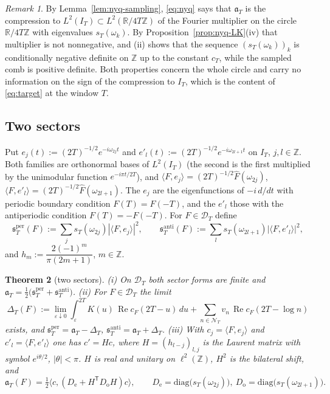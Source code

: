 \documentclass[11pt]{amsart}
\newtheorem{theorem}{Theorem}[section]
\theoremstyle{definition}
\theoremstyle{remark}
\newtheorem{remark}[theorem]{Remark}
\newcommand{\R}{\mathbb R}
\newcommand{\Z}{\mathbb Z}
\newcommand{\Rel}{\operatorname{Re}}
\newcommand{\IT}{I_T}
\newcommand{\Fh}{\widehat F}
\newcommand{\cF}{c_F}
\newcommand{\NT}{\mathcal N_T}
\begin{document}
\begin{remark}\label{rem:nyq-circle}
By Lemma~\ref{lem:nyq-sampling}, \eqref{eq:nyq} says that $\mathfrak a_T$ is the compression to
$L^2(\IT)\subset L^2(\R/4T\Z)$ of the Fourier multiplier on the circle $\R/4T\Z$ with eigenvalues
$s_T(\omega_k)$. By Proposition~\ref{prop:nyq-LK}(iv) that multiplier is not nonnegative, and (ii) shows that the
sequence $(s_T(\omega_k))_k$ is conditionally negative definite on $\Z$ up to the constant $c_T$, while the sampled
comb is positive definite. Both properties concern the whole circle and carry no information on the sign of the
compression to $\IT$, which is the content of \eqref{eq:target} at the window $T$.
\end{remark}

\subsection{Two sectors}
Put $e_j(t):=(2T)^{-1/2}e^{-i\omega_{2j}t}$ and $e'_l(t):=(2T)^{-1/2}e^{-i\omega_{2l+1}t}$ on $\IT$, $j,l\in\Z$. Both
families are orthonormal bases of $L^2(\IT)$ (the second is the first multiplied by the unimodular function
$e^{-i\pi t/2T}$), and $\langle F,e_j\rangle=(2T)^{-1/2}\Fh(\omega_{2j})$, $\langle F,e'_l\rangle=(2T)^{-1/2}\Fh(\omega_{2l+1})$.
The $e_j$ are the eigenfunctions of $-i\,d/dt$ with periodic boundary condition $F(T)=F(-T)$, and the $e'_l$ those with
the antiperiodic condition $F(T)=-F(-T)$. For $F\in\mathcal D_T$ define
\[
\mathfrak s^{\mathrm{per}}_T(F):=\sum_js_T(\omega_{2j})|\langle F,e_j\rangle|^2,\qquad
\mathfrak s^{\mathrm{anti}}_T(F):=\sum_ls_T(\omega_{2l+1})|\langle F,e'_l\rangle|^2,
\]
and $h_m:=\dfrac{2(-1)^m}{\pi(2m+1)}$, $m\in\Z$.

\begin{theorem}[two sectors]\label{thm:nyq-sectors}
\emph{(i)} On $\mathcal D_T$ both sector forms are finite and $\mathfrak a_T=\frac12\big(\mathfrak s^{\mathrm{per}}_T+\mathfrak s^{\mathrm{anti}}_T\big)$.
\emph{(ii)} For $F\in\mathcal D_T$ the limit
\[
\Delta_T(F):=\lim_{\varepsilon\downarrow0}\int_\varepsilon^{2T}K(u)\,\Rel\cF(2T-u)\,du+\sum_{n\in\NT}v_n\,\Rel\cF(2T-\log n)
\]
exists, and $\mathfrak s^{\mathrm{per}}_T=\mathfrak a_T-\Delta_T$, $\mathfrak s^{\mathrm{anti}}_T=\mathfrak a_T+\Delta_T$.
\emph{(iii)} With $c_j=\langle F,e_j\rangle$ and $c'_l=\langle F,e'_l\rangle$ one has $c'=Hc$, where $H=(h_{l-j})_{l,j}$ is the
Laurent matrix with symbol $e^{i\theta/2}$, $|\theta|<\pi$. $H$ is real and unitary on $\ell^2(\Z)$, $H^2$ is the
bilateral shift, and
\[
\mathfrak a_T(F)=\tfrac12\big\langle c,(D_{\mathrm e}+H^{\mathsf T}D_{\mathrm o}H)c\big\rangle,\qquad
D_{\mathrm e}=\mathrm{diag}\big(s_T(\omega_{2j})\big),\ D_{\mathrm o}=\mathrm{diag}\big(s_T(\omega_{2l+1})\big).
\]
\end{theorem}
\end{document}
